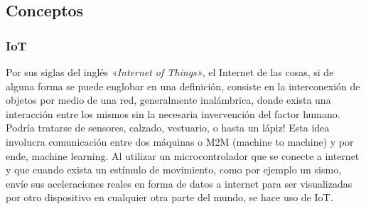 \subsection{Conceptos}

\subsubsection{IoT}
Por sus siglas del inglés \textit{«Internet of Things»}, el Internet de las cosas, si de alguna forma se puede englobar en una definición, consiste en la interconexión de objetos por medio de una red, generalmente inalámbrica, donde exista una interacción entre los mismos sin la necesaria invervención del factor humano.\\
Podría tratarse de sensores, calzado, vestuario, o hasta un lápiz! Esta idea involucra comunicación entre dos máquinas o M2M (machine to machine) y por ende, machine learning. Al utilizar un microcontrolador que se conecte a internet y que cuando exista un estímulo de movimiento, como por ejemplo un sismo, envíe sus aceleraciones reales en forma de datos a internet para ser visualizadas por otro dispositivo en cualquier otra parte del mundo, se hace uso de IoT.
 